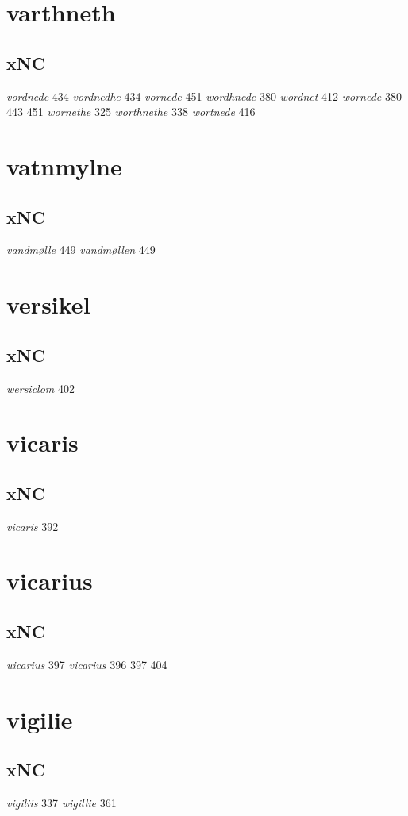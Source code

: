 \documentclass[a4paper,twocolumn]{article}
\begin{document}
\section{varthneth}
\label{sec:org43a6870}
\subsection{xNC}
\label{sec:org457f85e}
\emph{vordnede} 434 \emph{vordnedhe} 434 \emph{vornede} 451 \emph{wordhnede} 380 \emph{wordnet} 412 \emph{wornede} 380 443 451 \emph{wornethe} 325 \emph{worthnethe} 338 \emph{wortnede} 416 
\section{vatnmylne}
\label{sec:org4cb1e63}
\subsection{xNC}
\label{sec:orgb3fb801}
\emph{vandmølle} 449 \emph{vandmøllen} 449 
\section{versikel}
\label{sec:org5738fe1}
\subsection{xNC}
\label{sec:orgcdc57ff}
\emph{wersiclom} 402 
\section{vicaris}
\label{sec:org930e4e2}
\subsection{xNC}
\label{sec:orgadd8a92}
\emph{vicaris} 392 
\section{vicarius}
\label{sec:org683a47b}
\subsection{xNC}
\label{sec:org28cd476}
\emph{uicarius} 397 \emph{vicarius} 396 397 404 
\section{vigilie}
\label{sec:orgc5f75bc}
\subsection{xNC}
\label{sec:orgbfcd93a}
\emph{vigiliis} 337 \emph{wigillie} 361 
\end{document}
